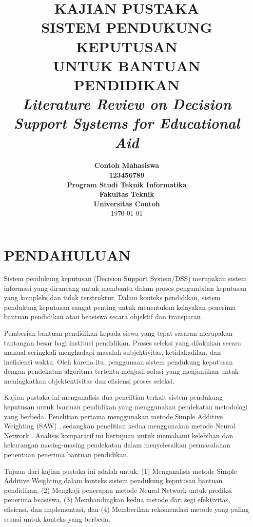 \documentclass[10pt,a4paper]{article}
\title{
    \vspace{-2cm}
    \Huge\textbf{KAJIAN PUSTAKA}\\
    \vspace{0.5cm}
    \Large\textbf{SISTEM PENDUKUNG KEPUTUSAN}\\
    \Large\textbf{UNTUK BANTUAN PENDIDIKAN}\\
    \vspace{1cm}
    \normalsize\textit{Literature Review on Decision Support Systems for Educational Aid}
}
\author{
    \textbf{Contoh Mahasiswa}\\
    \textbf{123456789}\\
    \vspace{0.5cm}
    \textbf{Program Studi Teknik Informatika}\\
    \textbf{Fakultas Teknik}\\
    \textbf{Universitas Contoh}\\
    \vspace{1cm}
    \today
}
\date{}
\begin{document}
\maketitle
\thispagestyle{empty}
\newpage

\tableofcontents
\thispagestyle{empty}
\newpage

\setcounter{page}{1}

\section{PENDAHULUAN}

Sistem pendukung keputusan (Decision Support System/DSS) merupakan sistem informasi yang dirancang untuk membantu dalam proses pengambilan keputusan yang kompleks dan tidak terstruktur. Dalam konteks pendidikan, sistem pendukung keputusan sangat penting untuk menentukan kelayakan penerima bantuan pendidikan atau beasiswa secara objektif dan transparan \cite{turban2005decision}.

Pemberian bantuan pendidikan kepada siswa yang tepat sasaran merupakan tantangan besar bagi institusi pendidikan. Proses seleksi yang dilakukan secara manual seringkali menghadapi masalah subjektivitas, ketidakadilan, dan inefisiensi waktu. Oleh karena itu, penggunaan sistem pendukung keputusan dengan pendekatan algoritma tertentu menjadi solusi yang menjanjikan untuk meningkatkan objektektivitas dan efisiensi proses seleksi.

Kajian pustaka ini menganalisis dua penelitian terkait sistem pendukung keputusan untuk bantuan pendidikan yang menggunakan pendekatan metodologi yang berbeda. Penelitian pertama menggunakan metode Simple Additive Weighting (SAW) \cite{saw_bantuan_pendidikan}, sedangkan penelitian kedua menggunakan metode Neural Network \cite{neural_network_beasiswa}. Analisis komparatif ini bertujuan untuk memahami kelebihan dan kekurangan masing-masing pendekatan dalam menyelesaikan permasalahan penentuan penerima bantuan pendidikan.

Tujuan dari kajian pustaka ini adalah untuk: (1) Menganalisis metode Simple Additive Weighting dalam konteks sistem pendukung keputusan bantuan pendidikan, (2) Mengkaji penerapan metode Neural Network untuk prediksi penerima beasiswa, (3) Membandingkan kedua metode dari segi efektivitas, efisiensi, dan implementasi, dan (4) Memberikan rekomendasi metode yang paling sesuai untuk konteks yang berbeda.

\end{document}
